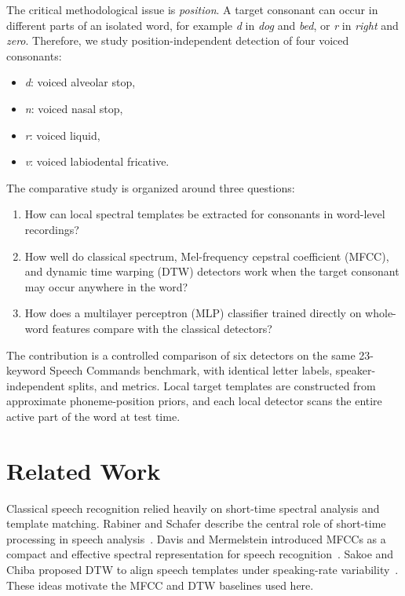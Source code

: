 \documentclass[conference]{IEEEtran}
\begin{document}
The critical methodological issue is \emph{position}. A target consonant can occur in different parts of an isolated word, for example \textit{d} in \textit{dog} and \textit{bed}, or \textit{r} in \textit{right} and \textit{zero}. Therefore, we study position-independent detection of four voiced consonants:
\begin{itemize}
    \item \textit{d}: voiced alveolar stop,
    \item \textit{n}: voiced nasal stop,
    \item \textit{r}: voiced liquid,
    \item \textit{v}: voiced labiodental fricative.
\end{itemize}

The comparative study is organized around three questions:
\begin{enumerate}
    \item How can local spectral templates be extracted for consonants in word-level recordings?
    \item How well do classical spectrum, Mel-frequency cepstral coefficient (MFCC), and dynamic time warping (DTW) detectors work when the target consonant may occur anywhere in the word?
    \item How does a multilayer perceptron (MLP) classifier trained directly on whole-word features compare with the classical detectors?
\end{enumerate}

The contribution is a controlled comparison of six detectors on the same 23-keyword Speech Commands benchmark, with identical letter labels, speaker-independent splits, and metrics. Local target templates are constructed from approximate phoneme-position priors, and each local detector scans the entire active part of the word at test time.

\section{Related Work}
Classical speech recognition relied heavily on short-time spectral analysis and template matching. Rabiner and Schafer describe the central role of short-time processing in speech analysis~\cite{rabiner1978digital}. Davis and Mermelstein introduced MFCCs as a compact and effective spectral representation for speech recognition~\cite{davis1980comparison}. Sakoe and Chiba proposed DTW to align speech templates under speaking-rate variability~\cite{sakoe1978dynamic}. These ideas motivate the MFCC and DTW baselines used here.
\end{document}
